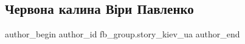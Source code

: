 
 
 
 
 

\subsection{Червона калина Віри Павленко}
\label{sec:22_02_2023.fb.fb_group.story_kiev_ua.1.chervona_kalina_v_ri}

\ifcmt
 author_begin
   author_id fb_group.story_kiev_ua
 author_end
\fi
